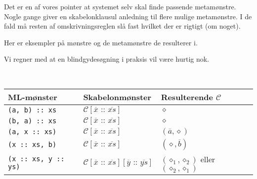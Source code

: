 




Det er en af vores pointer at systemet selv skal finde passende
metamønstre. Nogle gange giver en skabelonklausul anledning til flere
mulige metamønstre. I de fald må resten af omskrivningsreglen slå fast hvilket
der er rigtigt (om noget).

Her er eksempler på mønstre og de metamønstre de resulterer i.

Vi regner med at en blindgydesøgning i praksis vil være hurtig nok.

  \begin{example} \ 


    \begin{tabular}{l|l|l} 
      ML-mønster & Skabelonmønster & Resulterende
      $\mathcal{C}$ \\ \hline
      
      \texttt{(a, b) :: xs} & $\mathcal{C}[\overline{x} \texttt{ :: } \overline{xs}]$ &
      $\diamond$ \\

      \texttt{(b, a) :: xs} & $\mathcal{C}[\overline{x} \texttt{ :: } \overline{xs}]$ &
      $\diamond$ \\

      \texttt{(a, x :: xs)} & $\mathcal{C}[\overline{x} \texttt{ :: } \overline{xs}]$ &
      $(\overline{a}, \diamond)$ \\

      \texttt{(x :: xs, b)} & $\mathcal{C}[\overline{x} \texttt{ :: } \overline{xs}]$ &
      $(\diamond, \overline{b})$ \\

      \texttt{(x :: xs, y :: ys)} & $\mathcal{C}[\overline{x} \texttt{ :: }
      \overline{xs}][\overline{y} \texttt{ :: } \overline{ys}]$ &
      $(\diamond_1, \diamond_2)$ eller $(\diamond_2, \diamond_1)$\\
      
    \end{tabular}
    
  \end{example}


